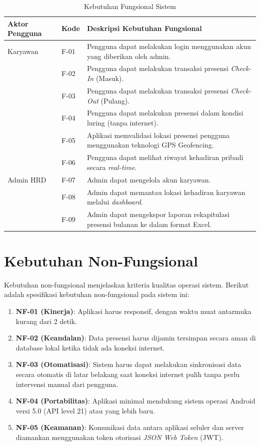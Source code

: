 \begin{table}[ht]
\centering
\caption{Kebutuhan Fungsional Sistem}
\label{tab:kebutuhan_sistem}
\begin{tabular}{|l|l|p{8cm}|}
\hline
\textbf{Aktor Pengguna} & \textbf{Kode} & \textbf{Deskripsi Kebutuhan Fungsional} \\ \hline
Karyawan & F-01 & Pengguna dapat melakukan login menggunakan akun yang diberikan oleh admin. \\ \hline
 & F-02 & Pengguna dapat melakukan transaksi presensi \textit{Check-In} (Masuk). \\ \hline
 & F-03 & Pengguna dapat melakukan transaksi presensi \textit{Check-Out} (Pulang). \\ \hline
 & F-04 & Pengguna dapat melakukan presensi dalam kondisi luring (tanpa internet). \\ \hline
 & F-05 & Aplikasi memvalidasi lokasi presensi pengguna menggunakan teknologi GPS Geofencing. \\ \hline
 & F-06 & Pengguna dapat melihat riwayat kehadiran pribadi secara \textit{real-time}. \\ \hline
Admin HRD & F-07 & Admin dapat mengelola akun karyawan. \\ \hline
 & F-08 & Admin dapat memantau lokasi kehadiran karyawan melalui \textit{dashboard}. \\ \hline
 & F-09 & Admin dapat mengekspor laporan rekapitulasi presensi bulanan ke dalam format Excel. \\ \hline
\end{tabular}
\end{table}

\section{Kebutuhan Non-Fungsional}
Kebutuhan non-fungsional menjelaskan kriteria kualitas operasi sistem. Berikut adalah spesifikasi kebutuhan non-fungsional pada sistem ini:
\begin{enumerate}
    \item \textbf{NF-01 (Kinerja)}: Aplikasi harus responsif, dengan waktu muat antarmuka kurang dari 2 detik.
    \item \textbf{NF-02 (Keandalan)}: Data presensi harus dijamin tersimpan secara aman di database lokal ketika tidak ada koneksi internet.
    \item \textbf{NF-03 (Otomatisasi)}: Sistem harus dapat melakukan sinkronisasi data secara otomatis di latar belakang saat koneksi internet pulih tanpa perlu intervensi manual dari pengguna.
    \item \textbf{NF-04 (Portabilitas)}: Aplikasi minimal mendukung sistem operasi Android versi 5.0 (API level 21) atau yang lebih baru.
    \item \textbf{NF-05 (Keamanan)}: Komunikasi data antara aplikasi seluler dan server diamankan menggunakan token otorisasi \textit{JSON Web Token} (JWT).
\end{enumerate}

